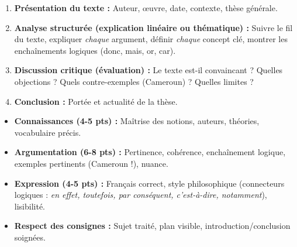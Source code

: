 \documentclass[11pt]{article}
\begin{document}
\begin{methode}
\begin{enumerate}
    \item \textbf{Présentation du texte :} Auteur, œuvre, date, contexte, thèse générale.
    \item \textbf{Analyse structurée (explication linéaire ou thématique) :} Suivre le fil du texte, expliquer \emph{chaque} argument, définir \emph{chaque} concept clé, montrer les enchaînements logiques (donc, mais, or, car).
    \item \textbf{Discussion critique (évaluation) :} Le texte est-il convaincant ? Quelles objections ? Quels contre-exemples (Cameroun) ? Quelles limites ?
    \item \textbf{Conclusion :} Portée et actualité de la thèse.
\end{enumerate}
\end{methode}

\begin{attention}
\begin{itemize}
    \item \textbf{Connaissances (4-5 pts) :} Maîtrise des notions, auteurs, théories, vocabulaire précis.
    \item \textbf{Argumentation (6-8 pts) :} Pertinence, cohérence, enchaînement logique, exemples pertinents (Cameroun !), nuance.
    \item \textbf{Expression (4-5 pts) :} Français correct, style philosophique (connecteurs logiques : \emph{en effet, toutefois, par conséquent, c'est-à-dire, notamment}), lisibilité.
    \item \textbf{Respect des consignes :} Sujet traité, plan visible, introduction/conclusion soignées.
\end{itemize}
\end{attention}
\end{document}

